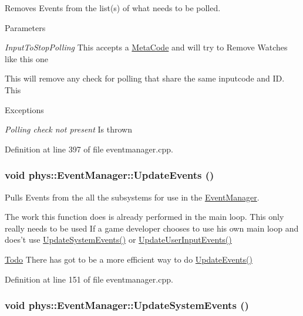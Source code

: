 Removes Events from the list(s) of what needs to be polled. 


\begin{DoxyParams}{Parameters}
\item[{\em InputToStopPolling}]This accepts a \hyperlink{classphys_1_1MetaCode}{MetaCode} and will try to Remove Watches like this one\end{DoxyParams}
This will remove any check for polling that share the same inputcode and ID. This 
\begin{DoxyExceptions}{Exceptions}
\item[{\em Polling check not present}]Is thrown \end{DoxyExceptions}


Definition at line 397 of file eventmanager.cpp.

\hypertarget{classphys_1_1EventManager_a63cf23dc9fe0ced3e2c60ca61c97b166}{
\subsubsection[{UpdateEvents}]{\setlength{\rightskip}{0pt plus 5cm}void phys::EventManager::UpdateEvents ()}}
\label{da/dde/classphys_1_1EventManager_a63cf23dc9fe0ced3e2c60ca61c97b166}


Pulls Events from the all the subsystems for use in the \hyperlink{classphys_1_1EventManager}{EventManager}. 

The work this function does is already performed in the main loop. This only really needs to be used If a game developer chooses to use his own main loop and does't use \hyperlink{classphys_1_1EventManager_a0cf574c55def063d66d7db46a4d3e8a5}{UpdateSystemEvents()} or \hyperlink{classphys_1_1EventManager_a01a5a131ac26679eee5dcf5dd514045c}{UpdateUserInputEvents()} 

\begin{Desc}
\item[\hyperlink{todo__todo000005}{Todo}]There has got to be a more efficient way to do \hyperlink{classphys_1_1EventManager_a63cf23dc9fe0ced3e2c60ca61c97b166}{UpdateEvents()} \end{Desc}




Definition at line 151 of file eventmanager.cpp.

\hypertarget{classphys_1_1EventManager_a0cf574c55def063d66d7db46a4d3e8a5}{
\subsubsection[{UpdateSystemEvents}]{\setlength{\rightskip}{0pt plus 5cm}void phys::EventManager::UpdateSystemEvents ()}}
\label{da/dde/classphys_1_1EventManager_a0cf574c55def063d66d7db46a4d3e8a5}


